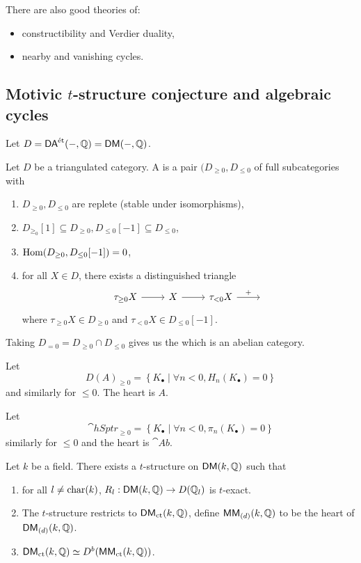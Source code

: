 There are also good theories of:
\begin{itemize}
	\item constructibility and Verdier duality,
	\item nearby and vanishing cycles.
\end{itemize}

\subsection{Motivic \texorpdfstring{$t$}{t}-structure conjecture and algebraic cycles}
Let $D = \mathsf{DA}^\text{\'et}(-,\mathbb Q) = \mathsf{DM}(-,\mathbb Q)$.
\begin{definition}
	Let $D$ be a triangulated category. A  is a pair $(D_{\ge 0}, D_{\le 0}$ of full subcategories with
	\begin{enumerate}[1)]
		\item $D_{\ge 0}, D_{\le 0}$  are replete (stable under isomorphisms),
		\item $D_{\ge_0}[1]\subseteq D_{\ge 0}, D_{\le 0}[-1]\subseteq D_{\le 0}$,
		\item $\operatorname{Hom}(D_{\ge 0}, D_{\le 0}[-1]) = 0$,
		\item for all $X\in D$, there exists a distinguished triangle
			\[
			\begin{tikzcd}
				\tau_{\ge 0}X \ar[r] & X \ar[r] & \tau_{<0}X \ar[r,"+"] & {}
			\end{tikzcd}
			\] 
			where $\tau_{\ge 0}X\in D_{\ge 0}$ and $\tau_{<0}X\in D_{\le 0}[-1]$.
	\end{enumerate}
	Taking $D_{=0} = D_{\ge 0}\cap D_{\le 0}$ gives us the  which is an abelian category.
\end{definition}
\begin{example}
	Let
	\[
	D(A)_{\ge 0} = \left\{ K_\bullet \middle| \forall n<0, H_n(K_\bullet)=0 \right\} 
	\] 
	and similarly for $\le 0$. The heart is $A$.
\end{example}
\begin{example}
	Let
	\[
		\cat{hSptr}_{\ge 0} = \left\{ K_\bullet \middle| \forall n<0, \pi_n(K_\bullet)=0 \right\} 
	\] 
	similarly for $\le 0$ and the heart is $\cat{Ab}$.
\end{example}
\begin{conjecture}[$T_k$]
	Let $k$ be a field. There exists a $t$-structure on $\mathsf{DM}(k,\mathbb Q)$ such that
	\begin{enumerate}[1)]
		\item for all $l\neq \operatorname{char}(k)$, $R_l:\cat{DM}(k,\Q)\to D(\Q_l)$ is $t$-exact.
		\item The $t$-structure restricts to $\mathsf{DM}_{\text{ct}}(k,\mathbb Q)$, define $\mathsf{MM}_{(d)}(k,\mathbb Q)$ to be the heart of $\mathsf{DM}_{(d)}(k,\mathbb Q)$.
		\item $\mathsf{DM}_{\text{ct}}(k,\mathbb Q) \simeq D^{b}(\mathsf{MM}_{\text{ct}}(k,\mathbb Q))$.
	\end{enumerate}
\end{conjecture}

